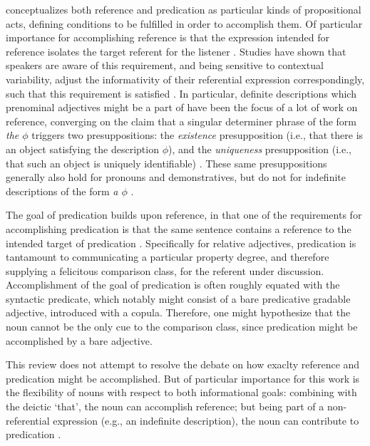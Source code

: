 \textcite{searle1969speech} conceptualizes both reference and predication as particular kinds of propositional acts, defining conditions to be fulfilled in order to accomplish them. Of particular importance for accomplishing reference is that the expression intended for reference isolates the target referent for the listener \parencite{searle1969speech}. Studies have shown that speakers are aware of this requirement, and being sensitive to contextual variability, adjust the informativity of their referential expression correspondingly, such that this requirement is satisfied \parencite[e.g.,][]{graf2016animal}. In particular, definite descriptions which prenominal adjectives might be a part of have been the focus of a lot of work on reference, converging on the claim that a singular determiner phrase of the form \emph{the $\phi$} triggers two presuppositions: the \textit{existence} presupposition (i.e., that there is an object satisfying the description $\phi$), and the \textit{uniqueness} presupposition (i.e., that such an object is uniquely identifiable) \parencite{syrett2010meaning, michaelson2019}. These same presuppositions generally also hold for pronouns and demonstratives, but do not for indefinite descriptions of the form \textit{a $\phi$} \parencite{braun2017, Reboul2001}. 

The goal of predication builds upon reference, in that one of the requirements for accomplishing predication is that the same sentence contains a reference to the intended target of predication \parencite{searle1969speech, Reboul2001}. Specifically for relative adjectives, predication is tantamount to communicating a particular property degree, and therefore supplying a felicitous comparison class, for the referent under discussion. Accomplishment of the goal of predication is often roughly equated with the syntactic predicate, which notably might consist of a bare predicative gradable adjective, introduced with a copula. Therefore, one might hypothesize that the noun cannot be the only cue to the comparison class, since predication might be accomplished by a bare adjective.

This review does not attempt to resolve the debate on how exaclty reference and predication might be accomplished. But of particular importance for this work is the flexibility of nouns with respect to both informational goals: combining with the deictic ‘that’, the noun can accomplish reference; but being part of a non-referential expression (e.g., an indefinite description), the noun can contribute to predication \parencite{Reboul2001}. 

